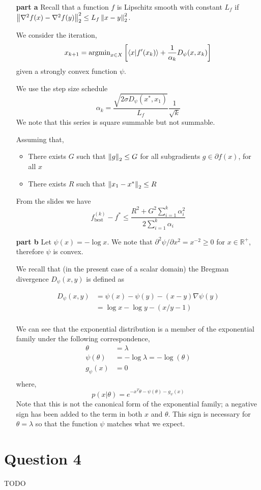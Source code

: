 \documentclass{article}
\begin{document}
\begin{enumerate}
\item[\bf part a]
  Recall that a function $f$ is Lipschitz smooth with constant $L_f$
  if $\left\lVert \nabla^2 f(x) - \nabla^2 f(y) \right\rVert_2^2 \le L_f \left\lVert x-y \right\rVert_2^2$.

  We consider the iteration,
  \[ x_{k+1} = \mathrm{argmin}_{x \in X} \left[ \braket{x \vert f'(x_k)} + \frac{1}{\alpha_k}
      D_\psi(x, x_k) \right] \]
  given a strongly convex function $\psi$.

  We use the step size schedule
  \[ \alpha_k = \frac{\sqrt{2 \sigma D_\psi(x^*, x_1)}}{L_f} \frac{1}{\sqrt k} \]
  We note that this series is square summable but not summable.

  Assuming that,

  \begin{itemize}
  \item There exists $G$ such that $\left\lVert g \right\rVert_2 \le G$ for all
    subgradients $g \in \partial f(x)$, for all $x$
  \item There exists $R$ such that $\left\lVert x_1 - x^* \right\rVert_2 \le R$
  \end{itemize}

  From the slides we have
  \[ f_\mathrm{best}^{(k)} - f^* \le \frac{R^2 + G^2 \sum_{i=1}^k \alpha_i^2}{2\sum_{i=1}^k \alpha_i}  \]


\item[\bf part b]
  Let $\psi(x) = - \log x$. We note that $\partial^2\psi / \partial
  x^2 = x^{-2} \ge 0$ for $x \in \mathbb{R}^+$, therefore $\psi$ is
  convex.

  We recall that (in the present case of a scalar domain) the Bregman
  divergence $D_\psi (x,y)$ is defined as

  \begin{align*}
    D_\psi (x,y) & = \psi(x) - \psi(y) - (x-y) \nabla\psi(y) \\
                & = \log x - \log y - (x/y - 1) \\
  \end{align*}

  We can see that the exponential distribution is a member of the
  exponential family under the following correspondence,
  \begin{align*}
    \theta & = \lambda \\
    \psi(\theta) & = -\log \lambda = -\log(\theta) \\
    g_\psi(x) & = 0 \\
  \end{align*}
  where,
  \[ p(x \vert \theta) = e^{-x^T \theta - \psi(\theta) - g_\psi(x)} \]
  Note that this is not the canonical form of the exponential family;
a negative sign has been added to the term in both $x$ and
$\theta$. This sign is necessary for $\theta = \lambda$ so that the
function $\psi$ matches what we expect.
\end{enumerate}

\section{Question 4}

TODO
\end{document}

